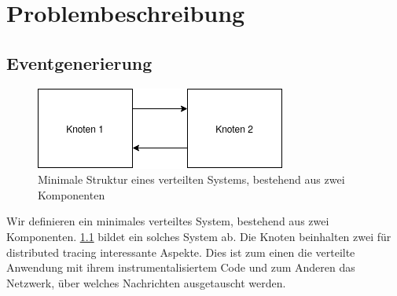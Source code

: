%

\chapter{Problembeschreibung}
\label{chapter:Problembeschreibung}
\section{Eventgenerierung}
\label{section:Eventgenerierung}


\begin{figure}[!ht]
	\centering
	\includegraphics[scale=0.5]{img/synchronisation/distributed_system_application_minimal.png}
	\caption[Minimale Struktur eines verteilten Systems]{Minimale Struktur eines verteilten Systems, bestehend aus zwei Komponenten}
	\label{fig:distributed_system_application_minimal}
\end{figure}

Wir definieren ein minimales verteiltes System, bestehend aus zwei Komponenten. \cref{fig:distributed_system_application_minimal} bildet ein solches System ab. Die Knoten beinhalten zwei für distributed tracing interessante Aspekte. Dies ist zum einen die verteilte Anwendung mit ihrem instrumentalisiertem Code und zum Anderen das Netzwerk, über welches Nachrichten ausgetauscht werden.

